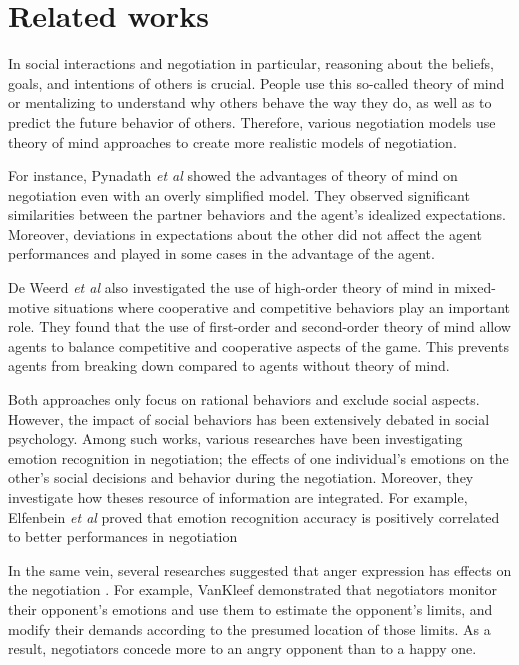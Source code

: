 \documentclass[sigconf]{aamas}  %
\begin{document}
	
	\section{Related works}
	
	In social interactions and negotiation in particular, reasoning about the beliefs, goals, and intentions of others is crucial. People use this so-called theory of mind \cite{premack1978does} or mentalizing to understand why others behave the way they do, as well as to predict the future behavior of others. Therefore, various negotiation models use theory of mind approaches to create  more realistic models of negotiation. 
	
	For instance, Pynadath \textit{et al}\cite{pynadath2013you} showed the advantages of theory of mind on negotiation even with an overly simplified model. They observed significant similarities between	the partner behaviors and the agent's idealized expectations. Moreover, deviations in expectations about the other did not affect the agent performances and played in some cases in the advantage of the agent.
	
	De Weerd \textit{et al} \cite{de2013higher} also investigated the use of high-order theory of mind in mixed-motive situations where cooperative and competitive behaviors play an important role. They found that the use of first-order and second-order theory of mind allow agents to balance competitive and cooperative	aspects of the game. This prevents agents from breaking down compared to  agents without theory of mind.
	
	
	Both approaches only focus on rational behaviors and exclude social aspects. However, the impact of social behaviors has been extensively debated in social psychology. Among such works, various researches have been investigating emotion recognition in negotiation; the effects of one individual's	emotions on the other's social decisions and behavior during the negotiation. Moreover, they investigate how theses resource of information are integrated.
	For example, Elfenbein\textit{ et al} \cite{elfenbein2007reading} proved that  emotion recognition accuracy is positively correlated to  better performances in negotiation
	
	In the same vein, several researches suggested that anger expression has effects on the negotiation \cite{sinaceur2006get,van2010interpersonal,ferguson2004social}. For example, VanKleef \cite{van2004interpersonal} demonstrated that negotiators monitor their opponent's emotions and use them to estimate the opponent's limits, and modify their demands according to the presumed location of those limits. As a result, negotiators concede more to an angry opponent than to a happy one. 
	
\end{document}
